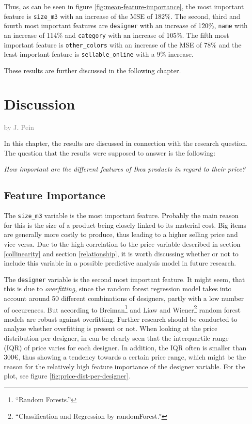 \documentclass[a4paper, nobind]{templates/ociamthesis}
\begin{document}
Thus, as can be seen in figure \ref{fig:mean-feature-importance}, the most important feature is \texttt{size\_m3} with an increase of the MSE of 182\%. The second, third and fourth most important features are \texttt{designer} with an increase of 120\%, \texttt{name} with an increase of 114\% and \texttt{category} with an increase of 105\%. The fifth most important feature is \texttt{other\_colors} with an increase of the MSE of 78\% and the least important feature is \texttt{sellable\_online} with a 9\% increase.

These results are further discussed in the following chapter.

\hypertarget{discussion}{%
\chapter{Discussion}\label{discussion}}

\hfill\textcolor{gray}{by J. Pein}

In this chapter, the results are discussed in connection with the research question. The question that the results were supposed to answer is the following:

\emph{How important are the different features of Ikea products in regard to their price?}

\hypertarget{feature-importance-1}{%
\section{Feature Importance}\label{feature-importance-1}}

The \texttt{size\_m3} variable is the most important feature. Probably the main reason for this is the size of a product being closely linked to its material cost. Big items are generally more costly to produce, thus leading to a higher selling price and vice versa. Due to the high correlation to the price variable described in section \ref{collinearity} and section \ref{relationship}, it is worth discussing whether or not to include this variable in a possible predictive analysis model in future research.

The \texttt{designer} variable is the second most important feature. It might seem, that this is due to \emph{overfitting}, since the random forest regression model takes into account around 50 different combinations of designers, partly with a low number of occurences. But according to Breiman\footnote{``Random Forests.''} and Liaw and Wiener\footnote{``Classification and Regression by randomForest.''} random forest models are robust against overfitting. Further research should be conducted to analyze whether overfitting is present or not.
When looking at the price distribution per designer, in can be clearly seen that the interquartile range (IQR) of price varies for each designer. In addition, the IQR often is smaller than 300€, thus showing a tendency towards a certain price range, which might be the reason for the relatively high feature importance of the designer variable. For the plot, see figure \ref{fig:price-dist-per-designer}.
\end{document}
